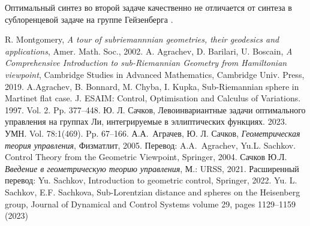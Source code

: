 Оптимальный синтез во второй задаче качественно не отличается от синтеза в сублоренцевой задаче на группе Гейзенберга    \cite{sl_heis}.


\begin{thebibliography}{9} %
R. Montgomery, {\em A tour of subriemannnian geometries, their geodesics and applications}, Amer. Math. Soc., 2002.
A. Agrachev, D. Barilari, U. Boscain, {\em A Comprehensive Introduction to
sub-Riemannian Geometry from Hamiltonian viewpoint}, Cambridge Studies in Advanced Mathematics, Cambridge Univ. Press, 2019.
A.Agrachev, B. Bonnard, M. Chyba, I. Kupka,
Sub-Riemannian sphere in Martinet flat case. J. ESAIM: Control, Optimisation and Calculus of Variations. 1997. Vol. 2. Pp. 377--448. 
Ю. Л. Сачков, Левоинвариантные задачи оптимального управления на группах Ли, интегрируемые в эллиптических функциях. 2023.  УМН. Vol. 78:1(469).  Pp. 67--166.
А.А.~Аграчев, Ю. Л. Сачков,  
{\em Геометрическая теория управления},
Физматлит, 2005.
Перевод: A.A.~Agrachev, Yu.L. Sachkov. Control Theory from the Geometric Viewpoint,
Springer, 2004.
Сачков Ю.Л. {\em Введение в геометрическую теорию управления}, М.: URSS, 2021.
Расширенный перевод:
Yu. Sachkov, Introduction to geometric control, Springer, 2022.
 	Yu. L. Sachkov, E.F. Sachkova, Sub-Lorentzian distance and spheres on the Heisenberg group, Journal of Dynamical and Control Systems volume 29, pages 1129–1159 (2023)
\end{thebibliography}




%

